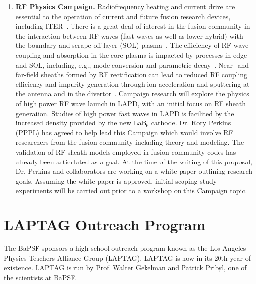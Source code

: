 \documentclass[11pt]{article}
\renewcommand{\cite}{\citep}
\begin{document}
\begin{enumerate}
\item {\bfseries RF Physics Campaign.} Radiofrequency heating and
  current drive are essential to the operation of current and future
  fusion research devices, including ITER~\cite{jaeger:2008}.  There is a great deal of
  interest in the fusion community in the interaction between RF waves
  (fast waves as well as lower-hybrid) with the boundary and
  scrape-off-layer (SOL) plasma~\cite{wallace:2011,jacquet:2011}.  The efficiency of RF wave coupling and
  absorption in the core plasma is impacted by processes in edge and
  SOL, including, e.g., mode-conversion and parametric decay~\cite{wukitch:2007,rost:2002}.  Near-
  and far-field sheaths formed by RF rectification can lead to reduced
  RF coupling efficiency and impurity generation through ion
  acceleration and sputtering at the antenna and in the divertor~\cite{ochoukov:2013,dippolito:2013}.
  Campaign research will explore the physics of high power RF wave
  launch in LAPD, with an initial focus on RF sheath generation.
  Studies of high power fast waves in LAPD is facilited by the
  increased density provided by the new LaB$_6$ cathode.  Dr. Rory
  Perkins (PPPL) has agreed to help lead this Campaign which would
  involve RF researchers from the fusion community including theory
  and modeling.  The validation of RF sheath models employed in fusion
  community codes has already been articulated as a goal.  At the time of
  the writing of this proposal, Dr. Perkins and collaborators are working on a
  white paper outlining research goals.  Assuming the white paper is
  approved, initial scoping study experiments will be carried out
  prior to a workshop on this Campaign topic.  
\end{enumerate}

\section{LAPTAG Outreach Program}

The BaPSF sponsors a high school outreach program known as the Los Angeles Physics Teachers Alliance Group  (LAPTAG).  
LAPTAG is now in its 20th year of existence.  LAPTAG is run by Prof. Walter Gekelman and Patrick Pribyl, one of the 
scientists at BaPSF.
\end{document}
